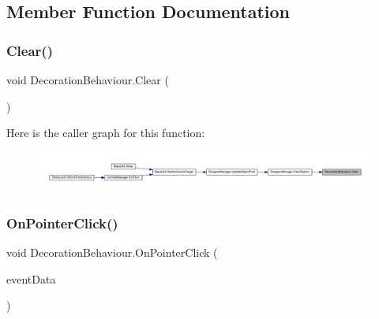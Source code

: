 \subsection{Member Function Documentation}
\mbox{\label{class_decoration_behaviour_aab39ad5614d361801ffc9168a830c3d7}} 
\subsubsection{\texorpdfstring{Clear()}{Clear()}}
{\footnotesize\ttfamily void Decoration\+Behaviour.\+Clear (\begin{DoxyParamCaption}{ }\end{DoxyParamCaption})}

Here is the caller graph for this function\+:\nopagebreak
\begin{figure}[H]
\begin{center}
\leavevmode
\includegraphics[width=350pt]{class_decoration_behaviour_aab39ad5614d361801ffc9168a830c3d7_icgraph}
\end{center}
\end{figure}
\mbox{\label{class_decoration_behaviour_a94a1b5e492f096e3f121d05105e16c37}} 
\subsubsection{\texorpdfstring{OnPointerClick()}{OnPointerClick()}}
{\footnotesize\ttfamily void Decoration\+Behaviour.\+On\+Pointer\+Click (\begin{DoxyParamCaption}\item[{Pointer\+Event\+Data}]{event\+Data }\end{DoxyParamCaption})}

